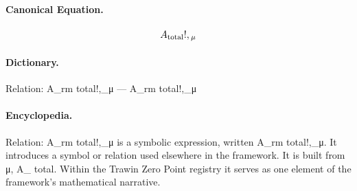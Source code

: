 \paragraph{Canonical Equation.}
\[
A_{\rm total}!,{}_\mu
\]

\paragraph{Dictionary.}
Relation: A\_rm total!,\_μ — A\_rm total!,\_μ

\paragraph{Encyclopedia.}
Relation: A\_rm total!,\_μ is a symbolic expression, written A\_rm total!,\_μ. It introduces a symbol or relation used elsewhere in the framework. It is built from μ, A\_ total. Within the Trawin Zero Point registry it serves as one element of the framework's mathematical narrative.
